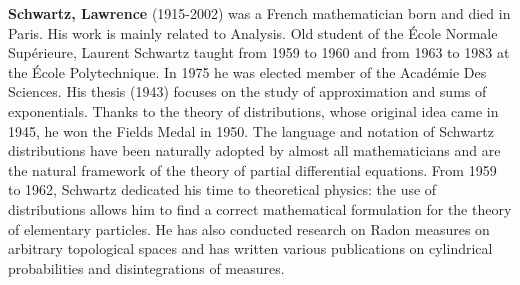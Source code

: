 \textbf{Schwartz, Lawrence} (1915-2002) was a French mathematician born and died in Paris. His work is mainly related to Analysis. Old student of the École Normale Supérieure, Laurent Schwartz taught from 1959 to 1960 and from 1963 to 1983 at the École Polytechnique. In 1975 he was elected member of the Académie Des Sciences. His thesis (1943) focuses on the study of approximation and sums of exponentials. Thanks to the theory of distributions, whose original idea came in 1945, he won the Fields Medal in 1950. The language and notation of Schwartz distributions have been naturally adopted by almost all mathematicians and are the natural framework of the theory of partial differential equations. From 1959 to 1962, Schwartz dedicated his time to theoretical physics: the use of distributions allows him to find a correct mathematical formulation for the theory of elementary particles. He has also conducted research on Radon measures on arbitrary topological spaces and has written various publications on cylindrical probabilities and disintegrations of measures.

